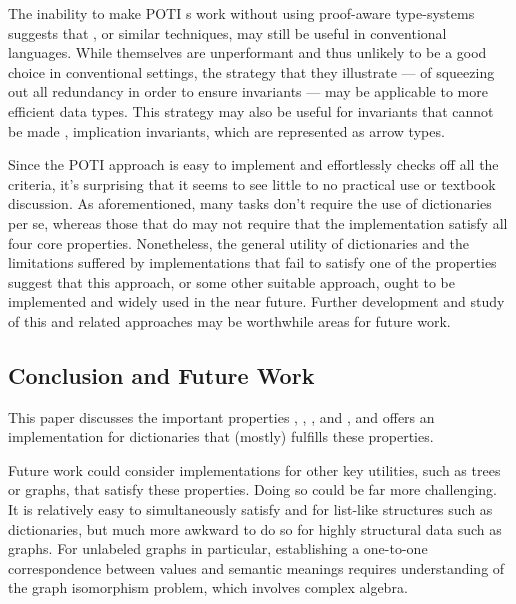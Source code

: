The inability to make POTI \cal{}s work without using proof-aware type-systems suggests that \dds{}, or similar techniques, may still be useful in conventional languages.
%
While \dds{} themselves are unperformant and thus unlikely to be a good choice in conventional settings,
%
the strategy that they illustrate --- of squeezing out all redundancy in order to ensure invariants --- may be applicable to more efficient data types.
%
This strategy may also be useful for invariants that cannot be made \prop, \eg{} implication invariants, which are represented as arrow types.

Since the POTI \cal{} approach is easy to implement and effortlessly checks off all the criteria, it's surprising that it seems to see little to no practical use or textbook discussion.
%
As aforementioned, many tasks don't require the use of dictionaries per se, whereas those that do may not require that the implementation satisfy all four core properties.
%
Nonetheless, the general utility of dictionaries and the limitations suffered by implementations that fail to satisfy one of the properties suggest that this approach,
%
or some other suitable approach, ought to be implemented and widely used in the near future.
%
Further development and study of this and related approaches may be worthwhile areas for future work.

\subsection{Conclusion and Future Work}
\label{sec:Discussion:Conclusion}
%
This paper discusses the important properties \SemTot, \SemInj, \EqDec, and \EzDstr, and offers an implementation for dictionaries that (mostly) fulfills these properties.

Future work could consider implementations for other key utilities, such as trees or graphs, that satisfy these properties.
%
Doing so could be far more challenging.
%
It is relatively easy to simultaneously satisfy \SemTot{} and \SemInj{} for list-like structures such as dictionaries,
%
but much more awkward to do so for highly structural data such as graphs. For unlabeled graphs in particular, establishing a one-to-one correspondence between values and
%
semantic meanings requires understanding of the graph isomorphism problem, which involves complex algebra.

